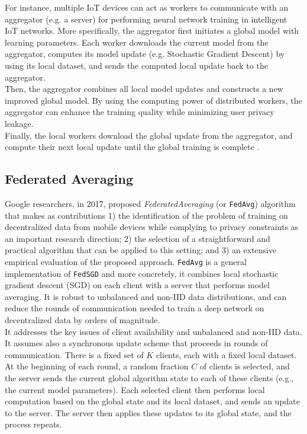 For instance, multiple IoT devices can act as workers to communicate with an aggregator (e.g. a server) for performing neural network training in intelligent IoT networks. More specifically, the aggregator first initiates a global model with
learning parameters. Each worker downloads the current model from the aggregator, computes its model update (e.g. Stochastic Gradient Descent) by using its local dataset, and sends the computed local update back to the aggregator. \\

Then, the aggregator combines all local model updates and constructs a new improved global model. By using the computing power of distributed workers, the aggregator can enhance the training quality while minimizing user privacy leakage. \\

Finally, the local workers download the global update from the aggregator, and compute their next local update until the global training is complete \cite{nguyen2021federated}.


\subsection{Federated Averaging}

Google researchers, in 2017, proposed \textit{FederatedAveraging} (or \texttt{FedAvg}) \cite{mcmahan2017communication} algorithm that makes as contributions 1) the identification of the problem of training on decentralized data from mobile devices while complying to privacy constraints as an important research direction; 2) the selection of a straightforward and practical algorithm that can be applied to this setting; and 3) an extensive empirical evaluation of the proposed approach. \texttt{FedAvg} is a general implementation of \texttt{FedSGD} and more concretely, it combines local stochastic gradient descent (SGD) on each client with a server that performs model averaging. It is robust to unbalanced and non-IID data distributions, and can reduce the rounds of communication needed to train a deep network on decentralized data by orders of magnitude. \\

It addresses the key issues of client availability and unbalanced and non-IID data. It assumes also a synchronous update scheme that proceeds in rounds of communication. There is a fixed set of $K$ clients, each with a fixed local dataset. At the beginning of each round, a random fraction $C$ of clients is selected, and the server sends the current global algorithm state to each of these clients (e.g., the current model parameters). Each selected client then performs local computation based on the global state and its local dataset, and sends an update to the server. The server then applies these updates to its global state, and the process repeats. \\

